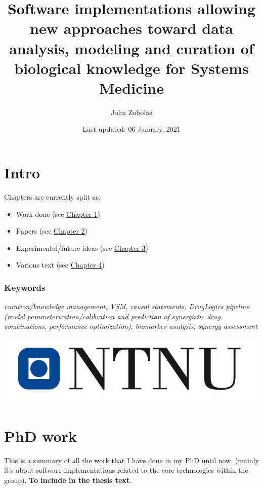 \documentclass[
  12pt,
]{book}
\title{Software implementations allowing new approaches toward data analysis, modeling and curation of biological knowledge for Systems Medicine}
\author{John Zobolas}
\date{Last updated: 06 January, 2021}
\providecommand{\tightlist}{%
  \setlength{\itemsep}{0pt}\setlength{\parskip}{0pt}}
\begin{document}
\maketitle

{
\hypersetup{linkcolor=}
\setcounter{tocdepth}{1}
\tableofcontents
}
\listoftables
\listoffigures
{}
\hypertarget{intro}{%
\chapter*{Intro}\label{intro}}

Chapters are currently split as:

\begin{itemize}
\tightlist
\item
  Work done (see \protect\hyperlink{phd-work}{Chapter 1})
\item
  Papers (see \protect\hyperlink{phd-papers}{Chapter 2})
\item
  Experimental/future ideas (see \protect\hyperlink{phd-ideas}{Chapter 3})
\item
  Various text (see \protect\hyperlink{text}{Chapter 4})
\end{itemize}

\hypertarget{keywords}{%
\subsection*{Keywords}\label{keywords}}

\emph{curation/knowledge management, VSM, causal statements, DrugLogics pipeline
(model parameterization/calibration and prediction of synergistic drug combinations, performance optimization), biomarker analysis, synergy assessment}

\begin{center}\includegraphics[width=0.5\linewidth]{img/NTNU-logo} \end{center}

\hypertarget{phd-work}{%
\chapter{PhD work}\label{phd-work}}

This is a summary of all the work that I have done in my PhD until now.
(mainly it's about software implementations related to the core technologies
within the group). \textbf{To include in the thesis text}.
\end{document}
